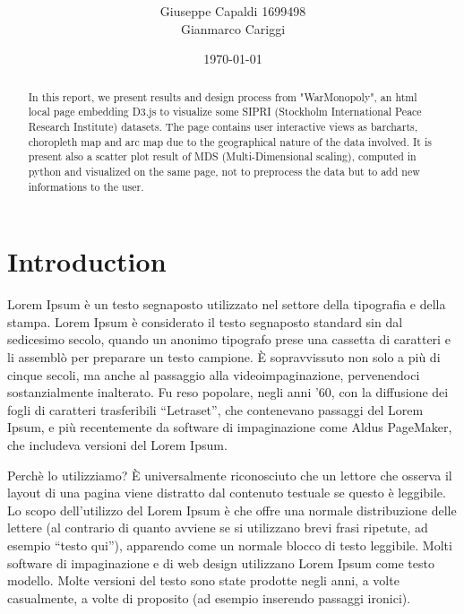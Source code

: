 \documentclass[twocolumn]{article}
\title{\spacecaps{WarMonopoly}\\ \normalsize \spacesc{Visual Analytics Course Sapienza University of Rome} }
\author{Giuseppe Capaldi 1699498\\Gianmarco Cariggi}
\date{\today}
\begin{document}
\maketitle

\begin{abstract}
%
In this report, we present results and design process from "WarMonopoly", an html local page embedding D3.js to visualize some SIPRI (Stockholm International Peace Research Institute) datasets. The page contains user interactive views as barcharts, choropleth map and arc map due to the geographical nature of the data involved. It is present also a scatter plot result of MDS (Multi-Dimensional scaling), computed in python and visualized on the same page, not to preprocess the data but to add new informations to the user.

%
\end{abstract}


\section{Introduction}
%
Lorem Ipsum è un testo segnaposto utilizzato nel settore della tipografia e della stampa. Lorem Ipsum è considerato il testo segnaposto standard sin dal sedicesimo secolo, quando un anonimo tipografo prese una cassetta di caratteri e li assemblò per preparare un testo campione. È sopravvissuto non solo a più di cinque secoli, ma anche al passaggio alla videoimpaginazione, pervenendoci sostanzialmente inalterato. Fu reso popolare, negli anni ’60, con la diffusione dei fogli di caratteri trasferibili “Letraset”, che contenevano passaggi del Lorem Ipsum, e più recentemente da software di impaginazione come Aldus PageMaker, che includeva versioni del Lorem Ipsum.

Perchè lo utilizziamo?
È universalmente riconosciuto che un lettore che osserva il layout di una pagina viene distratto dal contenuto testuale se questo è leggibile. Lo scopo dell’utilizzo del Lorem Ipsum è che offre una normale distribuzione delle lettere (al contrario di quanto avviene se si utilizzano brevi frasi ripetute, ad esempio “testo qui”), apparendo come un normale blocco di testo leggibile. Molti software di impaginazione e di web design utilizzano Lorem Ipsum come testo modello. Molte versioni del testo sono state prodotte negli anni, a volte casualmente, a volte di proposito (ad esempio inserendo passaggi ironici).
\end{document}
